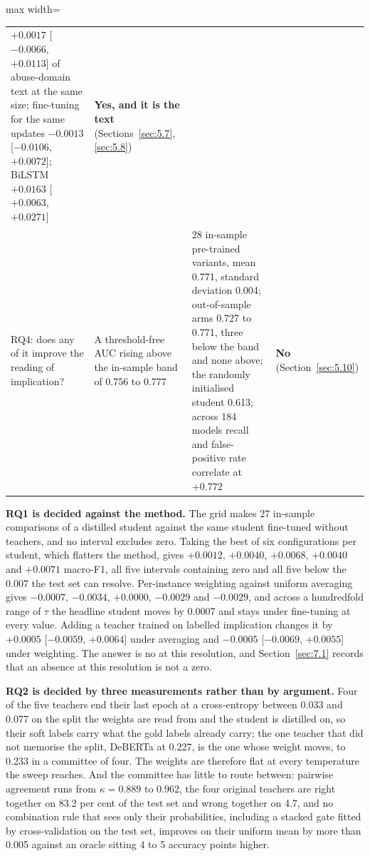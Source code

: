 \begin{table}[htbp]
\begin{adjustbox}{max width=\textwidth}
\begin{tabular}{p{2.0cm}p{3.5cm}p{5.6cm}p{2.3cm}}
$+0.0017$ [$-0.0066$, $+0.0113$] of abuse-domain text at the same size; fine-tuning for the same updates
$-0.0013$ [$-0.0106$, $+0.0072$]; BiLSTM $+0.0163$ [$+0.0063$, $+0.0271$] & \textbf{Yes, and it is the
text} (Sections~\ref{sec:5.7}, \ref{sec:5.8}) \\
RQ4: does any of it improve the reading of implication? & A threshold-free AUC rising above the
in-sample band of 0.756 to 0.777 & 28 in-sample pre-trained variants, mean 0.771, standard deviation
0.004; out-of-sample arms 0.727 to 0.771, three below the band and none above; the randomly initialised
student 0.613; across 184 models recall and false-positive rate correlate at $+0.772$ & \textbf{No}
(Section~\ref{sec:5.10}) \\
\bottomrule
\end{tabular}
\end{adjustbox}
\end{table}

\textbf{RQ1 is decided against the method.} The grid makes 27 in-sample comparisons of a distilled
student against the same student fine-tuned without teachers, and no interval excludes zero. Taking the
best of six configurations per student, which flatters the method, gives $+0.0012$, $+0.0040$,
$+0.0068$, $+0.0040$ and $+0.0071$ macro-F1, all five intervals containing zero and all five below the
0.007 the test set can resolve. Per-instance weighting against uniform averaging gives $-0.0007$,
$-0.0034$, $+0.0000$, $-0.0029$ and $-0.0029$, and across a hundredfold range of $\tau$ the headline
student moves by 0.0007 and stays under fine-tuning at every value. Adding a teacher trained on labelled
implication changes it by $+0.0005$ [$-0.0059$, $+0.0064$] under averaging and $-0.0005$ [$-0.0069$,
$+0.0055$] under weighting. The answer is no at this resolution, and Section~\ref{sec:7.1} records that
an absence at this resolution is not a zero.

\textbf{RQ2 is decided by three measurements rather than by argument.} Four of the five teachers end
their last epoch at a cross-entropy between 0.033 and 0.077 on the split the weights are read from and
the student is distilled on, so their soft labels carry what the gold labels already carry; the one
teacher that did not memorise the split, DeBERTa at 0.227, is the one whose weight moves, to 0.233 in a
committee of four. The weights are therefore flat at every temperature the sweep reaches. And the
committee has little to route between: pairwise agreement runs from $\kappa = 0.889$ to $0.962$, the
four original teachers are right together on 83.2 per cent of the test set and wrong together on 4.7,
and no combination rule that sees only their probabilities, including a stacked gate fitted by
cross-validation on the test set, improves on their uniform mean by more than 0.005 against an oracle
sitting 4 to 5 accuracy points higher.

